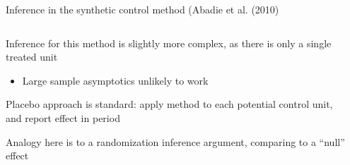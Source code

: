\documentclass[notes,11pt, aspectratio=169]{beamer}
\newenvironment{wideitemize}{\itemize\addtolength{\itemsep}{10pt}}{\enditemize}
\begin{document}
\begin{frame}{Inference in the synthetic control method (Abadie et al. (2010)}
  \begin{columns}[T] %
    \begin{column}{0.5\textwidth}
  \begin{wideitemize}
  \item Inference for this method is slightly more complex, as there
    is only a single treated unit
    \begin{itemize}
    \item Large sample asymptotics unlikely to work
    \end{itemize}
  \item Placebo approach is standard: apply method to each potential
    control unit, and report effect in period
  \item Analogy here is to a randomization inference argument,
    comparing to a ``null'' effect
  \end{wideitemize}
\end{column}
\begin{column}{0.5\textwidth}
\end{column}
\end{columns}
\end{frame}
\end{document}
